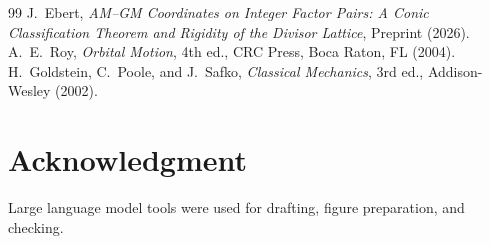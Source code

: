 \documentclass[11pt,3p,twocolumn]{elsarticle}
\begin{document}
\begin{thebibliography}{99}
J.~Ebert, \emph{AM--GM Coordinates on Integer Factor Pairs: A Conic Classification Theorem and Rigidity of the Divisor Lattice}, Preprint (2026).
A.~E.~Roy, \emph{Orbital Motion}, 4th ed., CRC Press, Boca Raton, FL (2004).
H.~Goldstein, C.~Poole, and J.~Safko, \emph{Classical Mechanics}, 3rd ed., Addison-Wesley (2002).
\end{thebibliography}

\section*{Acknowledgment}
Large language model tools were used for drafting, figure preparation, and checking.
\end{document}
